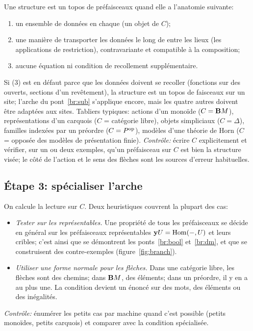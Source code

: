 Une structure est un topos de préfaisceaux quand elle a l'anatomie suivante:
\begin{enumerate}
\item un ensemble de données en chaque  (un objet de $C$);
\item une manière de transporter les données le long de  entre les lieux (les applications de restriction), contravariante et compatible à la composition;
\item aucune équation ni condition de recollement supplémentaire.
\end{enumerate}
Si (3) est en défaut parce que les données doivent se recoller (fonctions sur des ouverts, sections d'un revêtement), la structure est un topos de faisceaux sur un site; l'arche du pont~\ref{br:sub} s'applique encore, mais les quatre autres doivent être adaptées aux sites. Tabliers typiques: actions d'un monoïde ($C = \mathbf{B} M$), représentations d'un carquois ($C$ = catégorie libre), objets simpliciaux ($C = \Delta$), familles indexées par un préordre ($C = P^{\mathrm{op}}$), modèles d'une théorie de Horn ($C$ = opposée des modèles de présentation finie). \emph{Contrôle:} écrire $C$ explicitement et vérifier, sur un ou deux exemples, qu'un préfaisceau sur $C$ est bien la structure visée; le côté de l'action et le sens des flèches sont les sources d'erreur habituelles.

\subsection{Étape 3: spécialiser l'arche}

On calcule la lecture sur $C$. Deux heuristiques couvrent la plupart des cas:
\begin{itemize}
\item \emph{Tester sur les représentables.} Une propriété de tous les préfaisceaux se décide en général sur les préfaisceaux représentables $\mathbf{y} U = \operatorname{Hom}(-,U)$ et leurs cribles; c'est ainsi que se démontrent les ponts~\ref{br:bool} et~\ref{br:dm}, et que se construisent des contre-exemples (figure~\ref{fig:branch}).
\item \emph{Utiliser une forme normale pour les flèches.} Dans une catégorie libre, les flèches sont des chemins; dans $\mathbf{B} M$, des éléments; dans un préordre, il y en a au plus une. La condition devient un énoncé sur des mots, des éléments ou des inégalités.
\end{itemize}
\emph{Contrôle:} énumérer les petits cas par machine quand c'est possible (petits monoïdes, petits carquois) et comparer avec la condition spécialisée.

